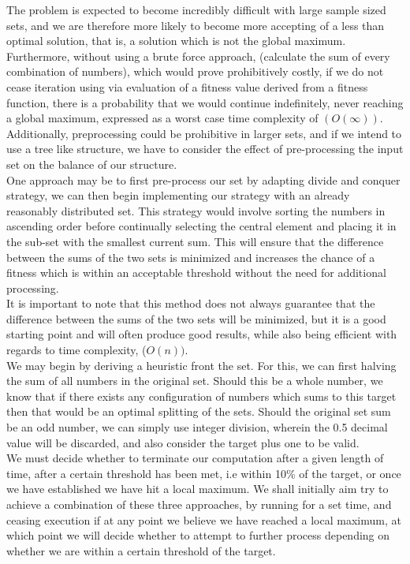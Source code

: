 \documentclass[a4paper]{article}
\begin{document}
The problem is expected to become
incredibly difficult with large sample sized sets, and we are therefore more likely to become more accepting of
a less than optimal solution, that is, a solution which is not the global maximum. 
Furthermore, without using a brute force approach, 
(calculate the sum of every combination of numbers), which would prove prohibitively costly,
if we do not cease iteration using via evaluation of a fitness value  derived from a fitness function,
there is a probability that
we would continue indefinitely, 
never reaching a global maximum, expressed as a worst case time complexity of $(O(\infty)).$ \\

Additionally, preprocessing could be prohibitive in larger sets, and if we intend to use a tree
like structure, we have to consider the effect of pre-processing the input set on the balance of our structure. \\

One approach may be to first pre-process our set by adapting divide and conquer strategy, we can then
begin implementing our 
strategy with an already reasonably distributed set. This strategy would involve sorting the numbers in ascending order before
continually selecting the central element and placing it in the sub-set with the smallest current sum.
This will ensure that the difference between the sums of the two sets is minimized and increases the chance of 
a fitness which is within an acceptable threshold without the need for additional processing. \\

It is important to note that this method does not always guarantee that the difference between the sums of the two sets will be minimized, 
but it is a good starting point and will often produce good results, while also being efficient with regards to time complexity, ($O(n)).$ \\

We may begin by deriving a heuristic front the set. For this, we can first 
halving the sum of all numbers in the original set.
Should this be a whole number, we know that if there exists any configuration of numbers which 
sums to this target then that would be an optimal splitting of the sets.
Should the original set sum be an odd number, we can simply use integer division, 
wherein the 0.5 decimal value will be discarded, and also consider the target plus one to be valid.\\

We must decide whether to terminate our computation after a given length of time, 
after a certain threshold has been met, i.e within 10\% of the target,
or once we have established we have hit a local maximum.
We shall initially aim try to achieve a combination of these three approaches, by running for a set time, 
and ceasing execution if at any point we believe we have reached a local maximum, at which point
we will decide whether to attempt to further process depending on whether we are within a certain threshold of the target.\\
\end{document}
